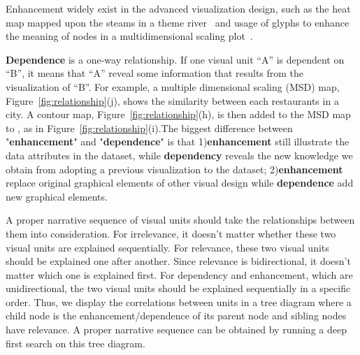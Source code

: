 Enhancement widely exist in the advanced visualization design, such as the heat map mapped upon the steams in a theme river~\cite{wu_opinionflow:_2014}  and usage of glyphs to enhance the meaning of nodes in a multidimensional scaling plot~\cite{chen_peakvizor:_2016}. 

\textbf{Dependence} is a one-way relationship. If one visual unit ``A'' is dependent on ``B'', it means that ``A'' reveal some information that results from the visualization of ``B''. For example, a multiple dimensional scaling (MSD) map, Figure~\ref{fig:relationship}(j), shows the similarity between each restaurants in a city. A contour map, Figure~\ref{fig:relationship}(h), is then added to the MSD map to , as in Figure~\ref{fig:relationship}(i).The biggest difference between "\textbf{enhancement}" and "\textbf{dependence}" is that 1)\textbf{enhancement} still illustrate the data attributes in the dataset, while \textbf{dependency} reveals the new knowledge we obtain from adopting a previous visualization to the dataset; 2)\textbf{enhancement} replace original graphical elements of other visual design while \textbf{dependence} add new graphical elements.

A proper narrative sequence of visual units should take the relationships between them into consideration. For irrelevance, it doesn't matter whether these two visual units are explained sequentially. For relevance, these two visual units should be explained one after another. Since relevance is bidirectional, it doesn't matter which one is explained first. For dependency and enhancement, which are unidirectional, the two visual units should be explained sequentially in a specific order. 
 Thus, we display the correlations between units in a tree diagram where a child node is the enhancement/dependence of its parent node and sibling nodes have relevance. A proper narrative sequence can be obtained by running a deep first search on this tree diagram. 



